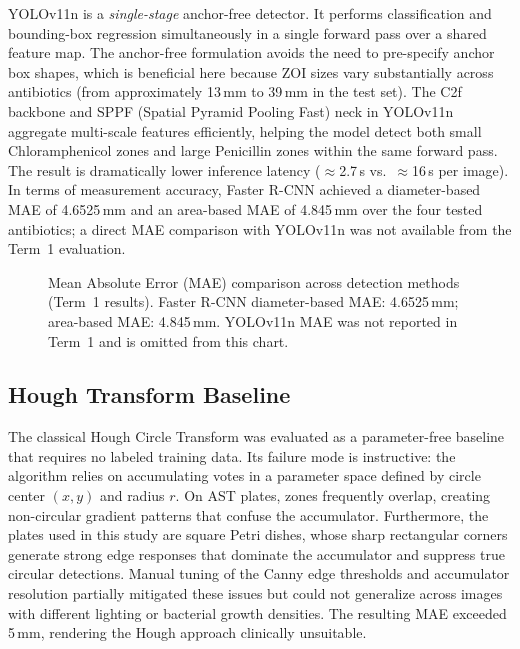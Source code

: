 YOLOv11n \cite{wang2024yolov11} is a \emph{single-stage} anchor-free detector.
It performs classification and bounding-box regression simultaneously in a single forward pass
over a shared feature map.
The anchor-free formulation avoids the need to pre-specify anchor box shapes,
which is beneficial here because ZOI sizes vary substantially across antibiotics
(from approximately 13\,mm to 39\,mm in the test set).
The C2f backbone and SPPF (Spatial Pyramid Pooling Fast) neck in YOLOv11n
aggregate multi-scale features efficiently,
helping the model detect both small Chloramphenicol zones and large Penicillin zones
within the same forward pass.
The result is dramatically lower inference latency ($\approx$2.7\,s vs.\ $\approx$16\,s per image).
In terms of measurement accuracy, Faster R-CNN achieved a diameter-based MAE of 4.6525\,mm
and an area-based MAE of 4.845\,mm over the four tested antibiotics;
a direct MAE comparison with YOLOv11n was not available from the Term~1 evaluation.

\begin{figure}[H]
  \centering
  \caption{Mean Absolute Error (MAE) comparison across detection methods (Term~1 results).
           Faster R-CNN diameter-based MAE: 4.6525\,mm; area-based MAE: 4.845\,mm.
           YOLOv11n MAE was not reported in Term~1 and is omitted from this chart.}
  \label{fig:mae_bar}
\end{figure}

\subsection{Hough Transform Baseline}

The classical Hough Circle Transform was evaluated as a parameter-free baseline
that requires no labeled training data.
Its failure mode is instructive: the algorithm relies on accumulating votes in a
parameter space defined by circle center $(x, y)$ and radius $r$.
On AST plates, zones frequently overlap, creating non-circular gradient patterns
that confuse the accumulator.
Furthermore, the plates used in this study are square Petri dishes,
whose sharp rectangular corners generate strong edge responses
that dominate the accumulator and suppress true circular detections.
Manual tuning of the Canny edge thresholds and accumulator resolution
partially mitigated these issues but could not generalize across images
with different lighting or bacterial growth densities.
The resulting MAE exceeded 5\,mm, rendering the Hough approach clinically unsuitable.

